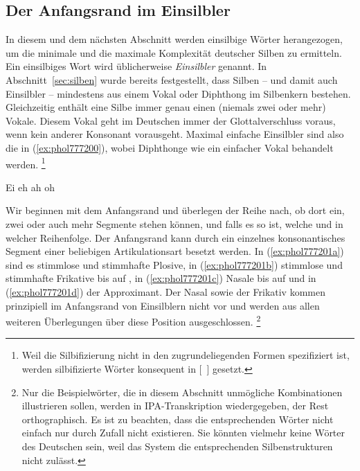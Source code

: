 \subsection{Der Anfangsrand im Einsilbler}

\label{sec:anfangsrandimeinsilbler}

In diesem und dem nächsten Abschnitt werden einsilbige Wörter herangezogen, um die minimale und die maximale Komplexität deutscher Silben zu ermitteln.
Ein einsilbiges Wort wird üblicherweise \textit{Einsilbler} genannt.
In Abschnitt~\ref{sec:silben} wurde bereits festgestellt, dass Silben -- und damit auch Einsilbler -- mindestens aus einem Vokal oder Diphthong im Silbenkern bestehen.
Gleichzeitig enthält eine Silbe immer genau einen (niemals zwei oder mehr) Vokale.
Diesem Vokal geht im Deutschen immer der Glottalverschluss voraus, wenn kein anderer Konsonant vorausgeht.
Maximal einfache Einsilbler sind also die in (\ref{ex:phol777200}), wobei Diphthonge wie ein einfacher Vokal behandelt werden.%
\footnote{Weil die Silbifizierung nicht in den zugrundeliegenden Formen spezifiziert ist, werden silbifizierte Wörter konsequent in [~] gesetzt.}

\begin{exe}
	\ex\label{ex:phol777200}
	\begin{xlist}
		\ex Ei \textipa{[P\t{aE}]}
		\ex eh \textipa{[Pe:]}
		\ex ah \textipa{[Pa:]}	
		\ex oh \textipa{[Po:]}	
	\end{xlist}
\end{exe}

Wir beginnen mit dem Anfangsrand und überlegen der Reihe nach, ob dort ein, zwei oder auch mehr Segmente stehen können, und falls es so ist, welche und in welcher Reihenfolge.
Der Anfangsrand kann durch ein einzelnes konsonantisches Segment einer beliebigen Artikulationsart besetzt werden.
In (\ref{ex:phol777201a}) sind es stimmlose und stimmhafte Plosive, in (\ref{ex:phol777201b}) stimmlose und stimmhafte Frikative bis auf \textipa{[\c{c}]}, in (\ref{ex:phol777201c}) Nasale bis auf \textipa{[N]} und in (\ref{ex:phol777201d}) der Approximant.
Der Nasal \textipa{[N]} sowie der Frikativ \textipa{[\c{c}]} kommen prinzipiell im Anfangsrand von Einsilblern nicht vor und werden aus allen weiteren Überlegungen über diese Position ausgeschlossen.%
\footnote{Nur die Beispielwörter, die in diesem Abschnitt unmögliche Kombinationen illustrieren sollen, werden in IPA-Transkription wiedergegeben, der Rest orthographisch.
Es ist zu beachten, dass die entsprechenden Wörter nicht einfach nur durch Zufall nicht existieren.
Sie könnten vielmehr keine Wörter des Deutschen sein, weil das System die entsprechenden Silbenstrukturen nicht zulässt.}

